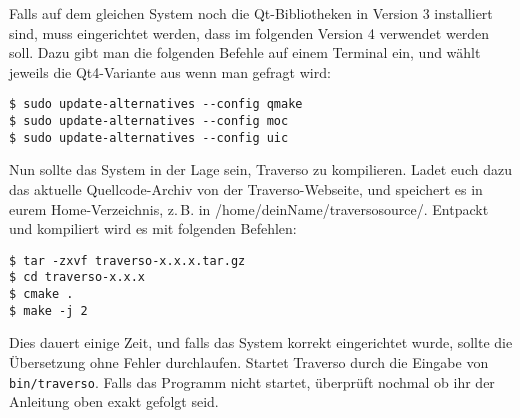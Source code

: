 Falls auf dem gleichen System noch die Qt-Bibliotheken in Version 3 installiert sind, muss eingerichtet werden, dass im folgenden Version 4 verwendet werden soll. Dazu gibt man die folgenden Befehle auf einem Terminal ein, und wählt jeweils die Qt4-Variante aus wenn man gefragt wird:

\begin{verbatim}
$ sudo update-alternatives --config qmake
$ sudo update-alternatives --config moc
$ sudo update-alternatives --config uic
\end{verbatim}

Nun sollte das System in der Lage sein, Traverso zu kompilieren. Ladet euch dazu das aktuelle Quellcode-Archiv von der Traverso-Webseite, und speichert es in eurem Home-Verzeichnis, z.\,B. in /home/deinName/traversosource/. Entpackt und kompiliert wird es mit folgenden Befehlen:

\begin{verbatim}
$ tar -zxvf traverso-x.x.x.tar.gz
$ cd traverso-x.x.x
$ cmake .
$ make -j 2
\end{verbatim}

Dies dauert einige Zeit, und falls das System korrekt eingerichtet wurde, sollte die Übersetzung ohne Fehler durchlaufen. Startet Traverso durch die Eingabe von \texttt{bin/traverso}. Falls das Programm nicht startet, überprüft nochmal ob ihr der Anleitung oben exakt gefolgt seid.
